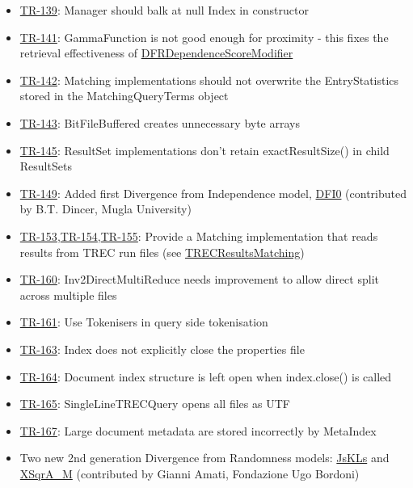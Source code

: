 \begin{itemize}
\item
  \href{http://terrier.org/issues/browse/TR-139}{TR-139}: Manager should
  balk at null Index in constructor
\item
  \href{http://terrier.org/issues/browse/TR-141}{TR-141}: GammaFunction
  is not good enough for proximity - this fixes the retrieval
  effectiveness of
  \href{javadoc/org/terrier/matching/dsms/DFRDependenceScoreModifier.html}{DFRDependenceScoreModifier}
\item
  \href{http://terrier.org/issues/browse/TR-142}{TR-142}: Matching
  implementations should not overwrite the EntryStatistics stored in the
  MatchingQueryTerms object
\item
  \href{http://terrier.org/issues/browse/TR-143}{TR-143}:
  BitFileBuffered creates unnecessary byte arrays
\item
  \href{http://terrier.org/issues/browse/TR-145}{TR-145}: ResultSet
  implementations don't retain exactResultSize() in child ResultSets
\item
  \href{http://terrier.org/issues/browse/TR-149}{TR-149}: Added first
  Divergence from Independence model,
  \href{javadoc/org/terrier/matching/models/DFI0.html}{DFI0}
  (contributed by B.T. Dincer, Mugla University)
\item
  \href{http://terrier.org/issues/browse/TR-153}{TR-153},\href{http://terrier.org/issues/browse/TR-154}{TR-154},\href{http://terrier.org/issues/browse/TR-155}{TR-155}:
  Provide a Matching implementation that reads results from TREC run
  files (see
  \href{javadoc/org/terrier/matching/TRECResultsMatching.html}{TRECResultsMatching})
\item
  \href{http://terrier.org/issues/browse/TR-160}{TR-160}:
  Inv2DirectMultiReduce needs improvement to allow direct split across
  multiple files
\item
  \href{http://terrier.org/issues/browse/TR-161}{TR-161}: Use Tokenisers
  in query side tokenisation
\item
  \href{http://terrier.org/issues/browse/TR-163}{TR-163}: Index does not
  explicitly close the properties file
\item
  \href{http://terrier.org/issues/browse/TR-164}{TR-164}: Document index
  structure is left open when index.close() is called
\item
  \href{http://terrier.org/issues/browse/TR-165}{TR-165}:
  SingleLineTRECQuery opens all files as UTF
\item
  \href{http://terrier.org/issues/browse/TR-167}{TR-167}: Large document
  metadata are stored incorrectly by MetaIndex
\item
  Two new 2nd generation Divergence from Randomness models:
  \href{javadoc/org/terrier/matching/models/Js_KLs.html}{JsKLs} and
  \href{javadoc/org/terrier/matching/models/XSqrA_M.html}{XSqrA\_M}
  (contributed by Gianni Amati, Fondazione Ugo Bordoni)
\end{itemize}

